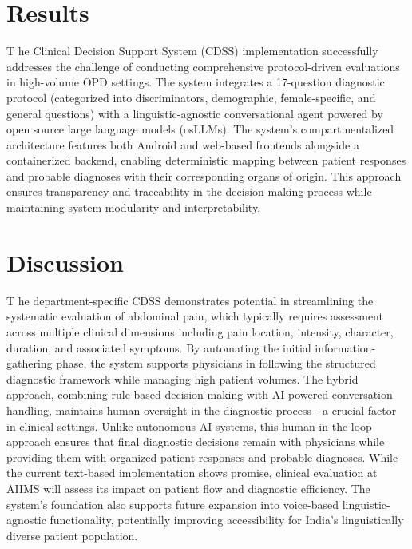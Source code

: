 \section{Results}
\lettrine{T}{ }he Clinical Decision Support System (CDSS) implementation successfully addresses the challenge of conducting comprehensive protocol-driven evaluations in high-volume OPD settings. The system integrates a 17-question diagnostic protocol (categorized into discriminators, demographic, female-specific, and general questions) with a linguistic-agnostic conversational agent powered by open source large language models (osLLMs). The system's compartmentalized architecture features both Android and web-based frontends alongside a containerized backend, enabling deterministic mapping between patient responses and probable diagnoses with their corresponding organs of origin. This approach ensures transparency and traceability in the decision-making process while maintaining system modularity and interpretability.


\section{Discussion}
\lettrine{T}{ }he department-specific CDSS demonstrates potential in streamlining the systematic evaluation of abdominal pain, which typically requires assessment across multiple clinical dimensions including pain location, intensity, character, duration, and associated symptoms. By automating the initial information-gathering phase, the system supports physicians in following the structured diagnostic framework while managing high patient volumes. The hybrid approach, combining rule-based decision-making with AI-powered conversation handling, maintains human oversight in the diagnostic process - a crucial factor in clinical settings. Unlike autonomous AI systems, this human-in-the-loop approach ensures that final diagnostic decisions remain with physicians while providing them with organized patient responses and probable diagnoses. While the current text-based implementation shows promise, clinical evaluation at AIIMS will assess its impact on patient flow and diagnostic efficiency. The system's foundation also supports future expansion into voice-based linguistic-agnostic functionality, potentially improving accessibility for India's linguistically diverse patient population.